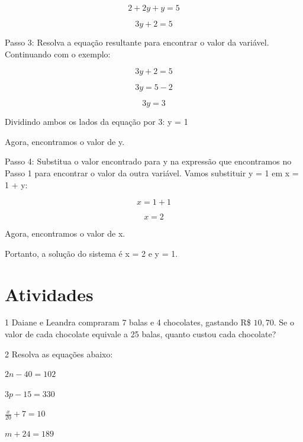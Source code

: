 $$2 + 2y + y = 5$$

$$3y + 2 = 5$$

Passo 3: Resolva a equação resultante para encontrar o valor da
variável. Continuando com o exemplo:

$$3y + 2 = 5$$

$$3y = 5 - 2$$

$$3y = 3$$

Dividindo ambos os lados da equação por 3: y = 1

Agora, encontramos o valor de y.

Passo 4: Substitua o valor encontrado para y na expressão que
encontramos no Passo 1 para encontrar o valor da outra variável. Vamos
substituir y = 1 em x = 1 + y:

$$x = 1 + 1$$

$$x = 2$$

Agora, encontramos o valor de x.

Portanto, a solução do sistema é x = 2 e y = 1.

\section{Atividades}

\num{1} Daiane e Leandra compraram 7 balas e 4 chocolates, gastando R\$ $10,70$. Se
o valor de cada chocolate equivale a 25 balas, quanto custou cada
chocolate?


\num{2} Resolva as equações abaixo:

\begin{escolha}
  \item $2n - 40 = 102$ 
  \item $3p - 15 = 330$ 
  \item $\frac{x}{20} + 7 = 10$ 
  \item $m + 24 = 189$ 
\end{escolha}

